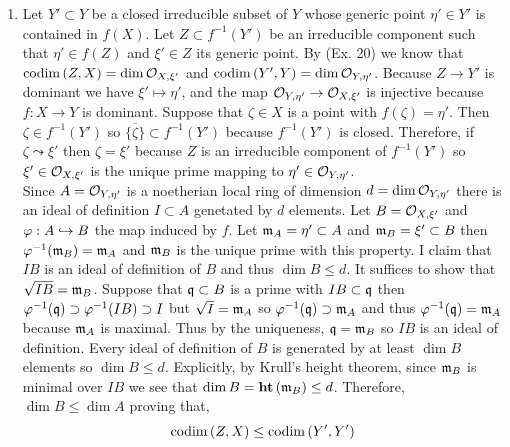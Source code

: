 \documentclass[12pt]{article}
\begin{document}
\begin{enumerate}
\item Let $Y' \subset Y$ be a closed irreducible subset of $Y$ whose generic point $\eta' \in Y'$ is contained in $f(X)$. Let $Z \subset f^{-1}(Y')$ be an irreducible component such that $\eta' \in f(Z)$ and $\xi' \in Z$ its generic point. By (Ex. 20) we know that $\mathrm{codim}\left( Z,X \right) = \dim \mathcal{O}_{X, \xi'}$ and $\mathrm{codim}\left( Y',Y \right) = \dim \mathcal{O}_{Y, \eta'}$. Because $Z \to Y'$ is dominant we have $\xi' \mapsto \eta'$, and the map $\mathcal{O}_{Y, \eta'} \to \mathcal{O}_{X, \xi'}$ is injective because $f : X \to Y$ is dominant. Suppose that $\zeta \in X$ is a point with $f(\zeta) = \eta'$. Then $\zeta \in f^{-1}(Y')$ so $\overline{ \{ \zeta \} } \subset f^{-1}(Y')$ because $f^{-1}(Y')$ is closed. Therefore, if $\zeta \leadsto \xi'$ then $\zeta = \xi'$ because $Z$ is an irreducible component of $f^{-1}(Y')$ so $\xi' \in \mathcal{O}_{X, \xi'}$ is the unique prime mapping to $\eta' \in \mathcal{O}_{Y, \eta'}$. 
\bigskip\\
Since $A = \mathcal{O}_{Y, \eta'}$ is a noetherian local ring of dimension $d = \dim \mathcal{O}_{Y, \eta'}$ there is an ideal of definition $I \subset A$ genetated by $d$ elements. Let $B = \mathcal{O}_{X, \xi'}$ and $\varphi : A \hookrightarrow B$ the map induced by $f$. Let $\mathfrak{m}_A = \eta' \subset A$ and $\mathfrak{m}_B = \xi' \subset B$ then $\varphi^{-1}(\mathfrak{m}_B) = \mathfrak{m}_A$ and $\mathfrak{m}_B$ is the unique prime with this property. I claim that $I B$ is an ideal of definition of $B$ and thus $\dim{B} \le d$. It suffices to show that $\sqrt{IB} = \mathfrak{m}_B$. Suppose that $\mathfrak{q} \subset B$ is a prime with $IB \subset \mathfrak{q}$ then $\varphi^{-1}(\mathfrak{q}) \supset \varphi^{-1}(IB) \supset I$ but $\sqrt{I} = \mathfrak{m}_A$ so $\varphi^{-1}(\mathfrak{q}) \supset \mathfrak{m}_A$ and thus $\varphi^{-1}(\mathfrak{q}) = \mathfrak{m}_A$ because $\mathfrak{m}_A$ is maximal. Thus by the uniqueness, $\mathfrak{q} = \mathfrak{m}_B$ so $IB$ is an ideal of definition. Every ideal of definition of $B$ is generated by at least $\dim{B}$ elements so $\dim{B} \le d$. Explicitly, by Krull's height theorem, since $\mathfrak{m}_B$ is minimal over $IB$ we see that $\dim{B} = \mathbf{ht}\left( \mathfrak{m}_B \right) \le d$. Therefore, $\dim{B} \le \dim{A}$ proving that,
\[ \mathrm{codim}\left( Z,X \right) \le \mathrm{codim}\left( Y',Y' \right) \]



\end{enumerate}
\end{document}
